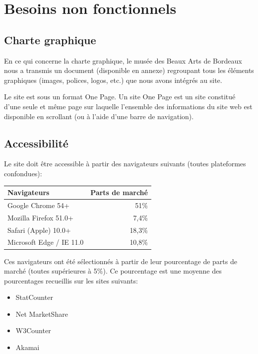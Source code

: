 \documentclass[11pt]{report}
\begin{document}

\section{Besoins non fonctionnels}

\subsection*{Charte graphique}

En ce qui concerne la charte graphique, le musée des Beaux Arts de Bordeaux nous a transmis un document (disponible en annexe) regroupant tous les éléments graphiques (images, polices, logos, etc.) que nous avons intégrés au site.

Le site est sous un format One Page. Un site One Page est un site constitué
d'une seule et même page sur laquelle l'ensemble des informations du site web
est disponible en scrollant (ou à l'aide d'une barre de navigation).

\subsection*{Accessibilité}

Le site doit être accessible à partir des navigateurs suivants (toutes plateformes confondues):
\begin{center}
	\begin{tabular}{|l | r|}
		\hline
		Navigateurs & Parts de marché \\
		\hline
		\hline
		Google Chrome 54+ & 51\% \\
		\hline
		Mozilla Firefox 51.0+ & 7,4\% \\
		\hline
		Safari (Apple) 10.0+ & 18,3\% \\
		\hline
		Microsoft Edge / IE 11.0 & 10,8\% \\
		\hline
	\end{tabular}
\end{center}
Ces navigateurs ont été sélectionnés à partir de leur pourcentage de parts de marché (toutes supérieures à 5\%). Ce pourcentage est une moyenne des pourcentages recueillis sur les sites suivants:
\begin{itemize}
	\item StatCounter
	\item Net MarketShare
	\item W3Counter
	\item Akamai
\end{itemize}
\end{document}
